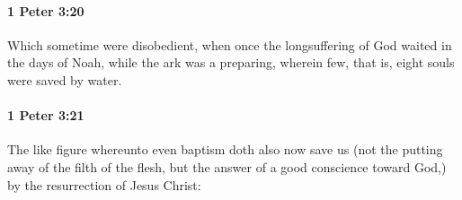 		\paragraph{1 Peter 3:20} %
			\label{1PETER-3-20}

			Which sometime were disobedient, when once the longsuffering of God waited in the days of Noah, while the ark was a preparing, wherein few, that is, eight souls were saved by water.

			\begin{framed}
			\scriptsize
				\begin{compactdesc}
					\item[SBLG] 
				\end{compactdesc}
			\end{framed}

		\paragraph{1 Peter 3:21} %
			\label{1PETER-3-21}

			The like figure whereunto even baptism doth also now save us (not the putting away of the filth of the flesh, but the answer of a good conscience toward God,) by the resurrection of Jesus Christ:

